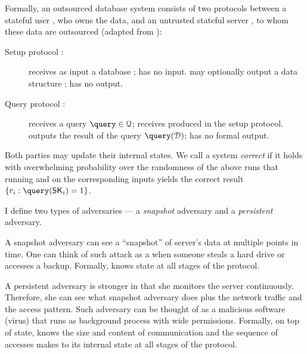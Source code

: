 		Formally, an outsourced database system consists of two protocols between a stateful user \user{}, who owns the data, and an untrusted stateful server \server{}, to whom these data are outsourced (adapted from \cite{epsolute}): %
		\begin{description}
			\item[Setup protocol \protocolSetup{}:]
				\user{} receives as input a database \databaseDef{}; \server{} has no input.
				\server{} may optionally output a data structure \serverDS{}; \user{} has no output.

			\item[Query protocol \protocolQuery{}:]
				\user{} receives a query $\query \in \querySet$; \server{} receives \serverDS{} produced in the setup protocol.
				\user{} outputs the result of the query $\query( \database )$; \server{} has no formal output.
		\end{description}
		Both parties may update their internal states.
		We call a system \emph{correct} if it holds with overwhelming probability over the randomness of the above runs that running \protocolSetup{} and  \protocolQuery{} on the corresponding inputs yields the correct result $\{ \record_i : \query( \searchKey_i ) = 1 \}$.

		I define two types of adversaries --- a \emph{snapshot} adversary and a \emph{persistent} adversary.

		A snapshot adversary can see a ``snapshot'' of server's data at multiple points in time.
		One can think of such attack as a when someone steals a hard drive or accesses a backup.
		Formally, \adversary{} knows \server{} state at all stages of the protocol.

		A persistent adversary is stronger in that she monitors the server continuously.
		Therefore, she can see what snapshot adversary does plus the network traffic and the access pattern.
		Such adversary can be thought of as a malicious software (virus) that runs as background process with wide permissions.
		Formally, on top of \server{} state, \adversary{} knows the size and content of \server{} communication and the sequence of accesses \server{} makes to its internal state at all stages of the protocol.

